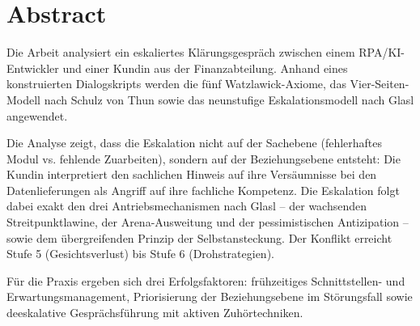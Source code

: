 
\chapter*{Abstract}

Die Arbeit analysiert ein eskaliertes Klärungsgespräch zwischen einem \acs{RPA}/\acs{KI}-Entwickler und einer Kundin aus der Finanzabteilung. Anhand eines konstruierten Dialogskripts werden die fünf Watzlawick-Axiome, das Vier-Seiten-Modell nach Schulz von Thun sowie das neunstufige Eskalationsmodell nach Glasl angewendet.

Die Analyse zeigt, dass die Eskalation nicht auf der Sachebene (fehlerhaftes Modul vs. fehlende Zuarbeiten), sondern auf der Beziehungsebene entsteht: Die Kundin interpretiert den sachlichen Hinweis auf ihre Versäumnisse bei den Datenlieferungen als Angriff auf ihre fachliche Kompetenz. Die Eskalation folgt dabei exakt den drei Antriebsmechanismen nach Glasl – der wachsenden Streitpunktlawine, der Arena-Ausweitung und der pessimistischen Antizipation – sowie dem übergreifenden Prinzip der Selbstansteckung. Der Konflikt erreicht Stufe 5 (Gesichtsverlust) bis Stufe 6 (Drohstrategien).

Für die Praxis ergeben sich drei Erfolgsfaktoren: frühzeitiges Schnittstellen- und Erwartungsmanagement, Priorisierung der Beziehungsebene im Störungsfall sowie deeskalative Gesprächsführung mit aktiven Zuhörtechniken.

